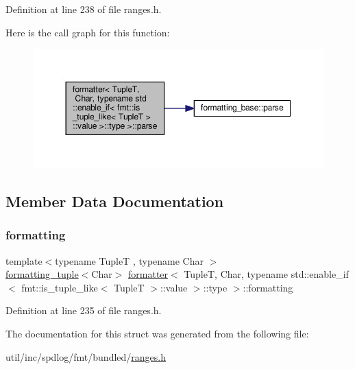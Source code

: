 Definition at line 238 of file ranges.\+h.

Here is the call graph for this function\+:
\nopagebreak
\begin{figure}[H]
\begin{center}
\leavevmode
\includegraphics[width=350pt]{structformatter_3_01_tuple_t_00_01_char_00_01typename_01std_1_1enable__if_3_01fmt_1_1is__tuple__a8a88f793f5f612c28a21643fc88182d_a7b66a353e2b9bf7e2806058857e03d90_cgraph}
\end{center}
\end{figure}


\subsection{Member Data Documentation}
\mbox{\label{structformatter_3_01_tuple_t_00_01_char_00_01typename_01std_1_1enable__if_3_01fmt_1_1is__tuple__a8a88f793f5f612c28a21643fc88182d_a25cee26a4ffe9ca5631076f4eb6cf865}} 
\subsubsection{\texorpdfstring{formatting}{formatting}}
{\footnotesize\ttfamily template$<$typename TupleT , typename Char $>$ \\
\hyperlink{structformatting__tuple}{formatting\+\_\+tuple}$<$Char$>$ \hyperlink{structformatter}{formatter}$<$ TupleT, Char, typename std\+::enable\+\_\+if$<$ fmt\+::is\+\_\+tuple\+\_\+like$<$ TupleT $>$\+::value $>$\+::type $>$\+::formatting}



Definition at line 235 of file ranges.\+h.



The documentation for this struct was generated from the following file\+:\begin{DoxyCompactItemize}
\item 
util/inc/spdlog/fmt/bundled/\hyperlink{ranges_8h}{ranges.\+h}\end{DoxyCompactItemize}
